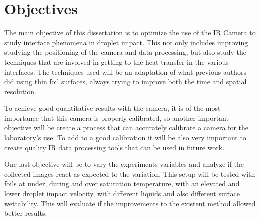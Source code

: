 \section{Objectives}
\label{sec:int_contributions}

\par The main objective of this dissertation is to optimize the use of the IR Camera to study interface phenomena in droplet impact. This not only includes improving studying the positioning of the camera and data processing, but also study the techniques that are involved in getting to the heat transfer in the various interfaces. The techniques used will be an adaptation of what previous authors did using thin foil surfaces, always trying to improve both the time and spatial resolution.\\

\par To achieve good quantitative results with the camera, it is of the most importance that this camera is properly calibrated, so another important objective will be create a process that can accurately calibrate a camera for the laboratory's use. To add to a good calibration it will be also very important to create quality IR data processing tools that can be used in future work.\\

\par One last objective will be to vary the experiments variables and analyze if the collected images react as expected to the variation. This setup will be tested with foils at under, during and over saturation temperature, with an elevated and lower droplet impact velocity, with different liquids and also different surface wettability. This will evaluate if the improvements to the existent method allowed better results.